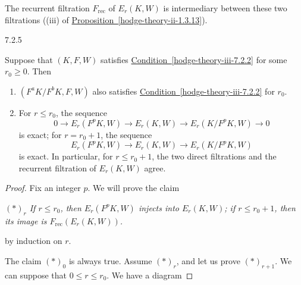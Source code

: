     The recurrent filtration \(F_{\mathrm {rec}}\) of \(E_r(K,W)\) is intermediary between these two filtrations ((iii) of \hyperref[hodge-theory-ii-1.3.13]{Proposition~\ref*{hodge-theory-ii-1.3.13}}).\begin{proposition}{7.2.5}\label{hodge-theory-iii-7.2.5}\skipsinglepar\par{}Suppose that \((K,F,W)\) satisfies \hyperref[hodge-theory-iii-7.2.2]{Condition~\ref*{hodge-theory-iii-7.2.2}} for some \(r_0\geqslant 0\).
    Then

    
 \begin{enumerate}
      
 \item[(i)]
        \((F^aK/F^bK,F,W)\) also satisfies \hyperref[hodge-theory-iii-7.2.2]{Condition~\ref*{hodge-theory-iii-7.2.2}} for \(r_0\).
      

      
 \item[(ii)]
        For \(r\leqslant  r_0\), the sequence
        \[           0           \to  E_r(F^pK,W)           \to  E_r(K,W)           \to  E_r(K/F^pK,W)           \to  0         \]
        is exact;
        for \(r=r_0+1\), the sequence
        \[           E_r(F^pK,W)           \to  E_r(K,W)           \to  E_r(K/F^pK,W)         \]
        is exact.
        In particular, for \(r\leqslant  r_0+1\), the two direct filtrations and the recurrent filtration of \(E_r(K,W)\) agree.
      

    \end{enumerate}\begin{proof}\par{}Fix an integer \(p\).
      We will prove the claim

      \label{hodge-theory-iii.7.2.5-inductive-claim}\par{}\emph{\((*)_r\) If \(r\leqslant  r_0\), then \(E_r(F^pK,W)\) injects into \(E_r(K,W)\);
            if \(r\leqslant  r_0+1\), then its image is \(F_\mathrm {rec}(E_r(K,W))\).}

      by induction on \(r\).\par{}The claim \((*)_0\) is always true.
      Assume \((*)_r\), and let us prove \((*)_{r+1}\).
      We can suppose that \(0\leqslant  r\leqslant  r_0\).
      We have a diagram
      
      



\end{proof}
\end{proposition}
